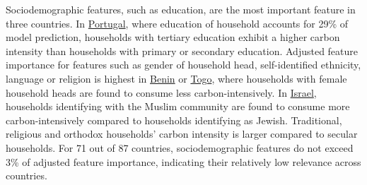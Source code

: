 \documentclass[12pt, a4paper]{article}
\begin{document}
Sociodemographic features, such as education, are the most important feature in three countries. In \hyperref[fig:5b_PRT]{Portugal}, where education of household accounts for 29\% of model prediction, households with tertiary education exhibit a higher carbon intensity than households with primary or secondary education. Adjusted feature importance for features such as gender of household head, self-identified ethnicity, language or religion is highest in \hyperref[fig:5b_BEN]{Benin} or \hyperref[fig:5b_TGO]{Togo}, where households with female household heads are found to consume less carbon-intensively. In \hyperref[fig:5b_ISR]{Israel}, households identifying with the Muslim community are found to consume more carbon-intensively compared to households identifying as Jewish. Traditional, religious and orthodox households' carbon intensity is larger compared to secular households. For 71 out of 87 countries, sociodemographic features do not exceed 3\% of adjusted feature importance, indicating their relatively low relevance across countries.
\end{document}
